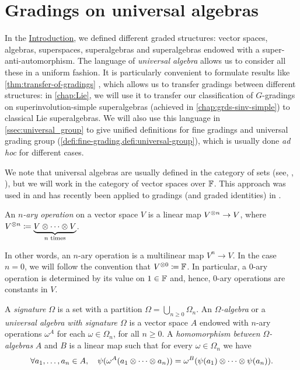 
\section{Gradings on universal algebras}\label{sec:Omega-algebras}

In the \hyperref[chap:intro]{Introduction}, we defined different graded structures: vector spaces, algebras, superspaces, superalgebras and superalgebras endowed with a super-anti-automorphism. 
The language of \emph{universal algebra} allows us to consider all these in a uniform fashion. 
It is particularly convenient to formulate results like \cref{thm:transfer-of-gradings} , which allows us to transfer gradings between different structures: in \cref{chap:Lie}, we will use it to transfer our classification of $G$-gradings on superinvolution-simple superalgebras (achieved in \cref{chap:grds-sinv-simple}) to classical Lie superalgebras. 
We will also use this language in \cref{ssec:universal_group} to give unified definitions for fine gradings and universal grading group (\cref{defi:fine-grading,defi:universal-group}), which is usually done \emph{ad hoc} for different cases. 

We note that universal algebras are usually defined in the category of sets (see, \eg, \cite{Cohn_universal}), but we will work in the category of vector spaces over $\mathbb{F}$. 
This approach was used in \cite{Razmyslov} and has recently been applied to gradings (and graded identities) in \cite{MR3886336}. 

\begin{defi}
    An \emph{$n$-ary operation} on a vector space $V$ is 
    a linear map $V^{\otimes n} \to V$, where $V^{\otimes n} \coloneqq \underbrace{V\otimes\cdots\otimes V}_{n \text{ times}}$. 
\end{defi}

In other words, an $n$-ary operation is a multilinear map $V^n \to V$. 
In the case $n = 0$, we will follow the convention that $V^{\otimes 0} \coloneqq \mathbb{F}$. 
In particular, a $0$-ary operation is determined by its value on $1 \in \mathbb{F}$ and, hence, $0$-ary operations are constants in $V$. 

\begin{defi}\label{def:universal-algebra}
	A \emph{signature} $\Omega$ is a set with a partition $\Omega = \bigcup_{n \geq 0} \Omega_n$.
	An \emph{$\Omega$-algebra} or a \emph{universal algebra with signature $\Omega$} is a vector space $A$ endowed with $n$-ary operations $\omega^A$ for each $\omega \in \Omega_n$, for all $n \geq 0$. 
	A \emph{homomorphism between $\Omega$-algebras} $A$ and $B$ is a linear map such that for every $\omega \in \Omega_n$ we have
	\[
		\forall a_1, \ldots, a_n \in A, \quad 
		\psi( \omega^A (a_1 \otimes \cdots \otimes a_n) ) = \omega^B ( \psi(a_1) \otimes \cdots \otimes \psi(a_n) ). 
	\]
\end{defi}

